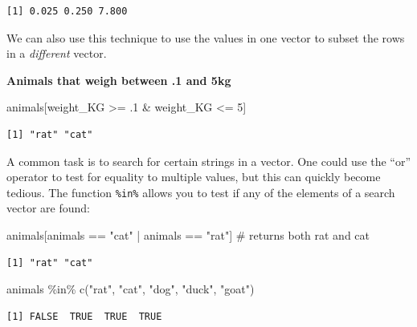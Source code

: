 \documentclass[
  letterpaper,
  DIV=11,
  numbers=noendperiod,
  oneside]{scrreprt}
\newenvironment{Shaded}{\begin{snugshade}}{\end{snugshade}}
\newcommand{\CommentTok}[1]{\textcolor[rgb]{0.37,0.37,0.37}{#1}}
\newcommand{\DecValTok}[1]{\textcolor[rgb]{0.68,0.00,0.00}{#1}}
\newcommand{\FunctionTok}[1]{\textcolor[rgb]{0.28,0.35,0.67}{#1}}
\newcommand{\NormalTok}[1]{\textcolor[rgb]{0.00,0.23,0.31}{#1}}
\newcommand{\SpecialCharTok}[1]{\textcolor[rgb]{0.37,0.37,0.37}{#1}}
\newcommand{\StringTok}[1]{\textcolor[rgb]{0.13,0.47,0.30}{#1}}
\begin{document}
\begin{verbatim}
[1] 0.025 0.250 7.800
\end{verbatim}

We can also use this technique to use the values in one vector to subset
the rows in a \emph{different} vector.

\textbf{Animals that weigh between .1 and 5kg}

\begin{Shaded}
\begin{Highlighting}[]
\NormalTok{animals[weight\_KG }\SpecialCharTok{\textgreater{}=}\NormalTok{ .}\DecValTok{1} \SpecialCharTok{\&}\NormalTok{ weight\_KG }\SpecialCharTok{\textless{}=} \DecValTok{5}\NormalTok{]}
\end{Highlighting}
\end{Shaded}

\begin{verbatim}
[1] "rat" "cat"
\end{verbatim}

A common task is to search for certain strings in a vector. One could
use the ``or'' operator \texttt{\textbar{}} to test for equality to
multiple values, but this can quickly become tedious. The function
\texttt{\%in\%} allows you to test if any of the elements of a search
vector are found:

\begin{Shaded}
\begin{Highlighting}[]
\NormalTok{animals[animals }\SpecialCharTok{==} \StringTok{"cat"} \SpecialCharTok{|}\NormalTok{ animals }\SpecialCharTok{==} \StringTok{"rat"}\NormalTok{] }\CommentTok{\# returns both rat and cat}
\end{Highlighting}
\end{Shaded}

\begin{verbatim}
[1] "rat" "cat"
\end{verbatim}

\begin{Shaded}
\begin{Highlighting}[]
\NormalTok{animals }\SpecialCharTok{\%in\%} \FunctionTok{c}\NormalTok{(}\StringTok{"rat"}\NormalTok{, }\StringTok{"cat"}\NormalTok{, }\StringTok{"dog"}\NormalTok{, }\StringTok{"duck"}\NormalTok{, }\StringTok{"goat"}\NormalTok{)}
\end{Highlighting}
\end{Shaded}

\begin{verbatim}
[1] FALSE  TRUE  TRUE  TRUE
\end{verbatim}
\end{document}
